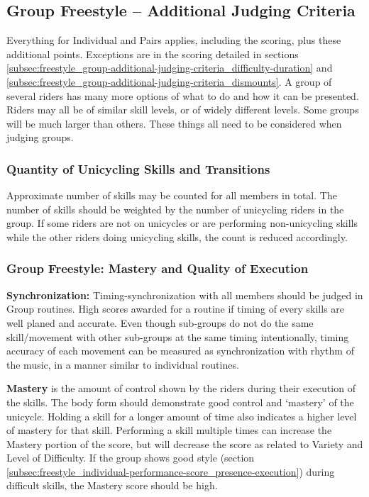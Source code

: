 \subsection{Group Freestyle -- Additional Judging Criteria}
Everything for Individual and Pairs applies, including the scoring, plus these additional points.
Exceptions are in the scoring detailed in sections \ref{subsec:freestyle_group-additional-judging-criteria_difficulty-duration} and \ref{subsec:freestyle_group-additional-judging-criteria_dismounts}.
A group of several riders has many more options of what to do and how it can be presented.
Riders may all be of similar skill levels, or of widely different levels.
Some groups will be much larger than others.
These things all need to be considered when judging groups.

\subsubsection{Quantity of Unicycling Skills and Transitions}
Approximate number of skills may be counted for all members in total.
The number of skills should be weighted by the number of unicycling riders in the group.
If some riders are not on unicycles or are performing non-unicycling skills while the other riders doing unicycling skills, the count is reduced accordingly.

\subsubsection{Group Freestyle: Mastery and Quality of Execution}
\textbf{Synchronization:} Timing-synchronization with all members should be judged in Group routines.
High scores awarded for a routine if timing of every skills are well planed and accurate.
Even though sub-groups do not do the same skill/movement with other sub-groups at the same timing intentionally, timing accuracy of each movement can be measured as synchronization with rhythm of the music, in a manner similar to individual routines.

\textbf{Mastery} is the amount of control shown by the riders during their execution of the skills.
The body form should demonstrate good control and `mastery' of the unicycle.
Holding a skill for a longer amount of time also indicates a higher level of mastery for that skill.
Performing a skill multiple times can increase the Mastery portion of the score, but will decrease the score as related to Variety and Level of Difficulty.
If the group shows good style (section \ref{subsec:freestyle_individual-performance-score_presence-execution}) during difficult skills, the Mastery score should be high.

